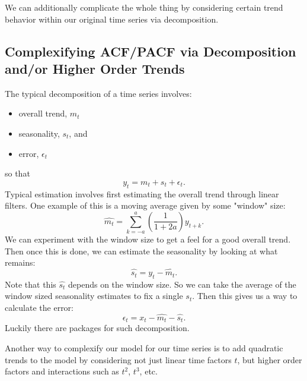 \documentclass[12pt]{article}
\theoremstyle{definition}
\begin{document}
We can additionally complicate the whole thing by considering certain trend behavior within our original time series via decomposition.

\subsection{Complexifying ACF/PACF via Decomposition and/or Higher Order Trends}
The typical decomposition of a time series involves:
\begin{itemize}
    \item overall trend, $m_t$
    \item seasonality, $s_t$, and
    \item error, $\epsilon_t$
\end{itemize}
so that
\[ y_t = m_t + s_t + \epsilon_t. \]
Typical estimation involves first estimating the overall trend through linear filters.  One example of this is a moving average given by some "window" size:
\[ \hat{m_t} = \sum_{k=-a}^a \left( \frac{1}{1+2a} \right) y_{t+k}. \]
We can experiment with the window size to get a feel for a good overall trend.  Then once this is done, we can estimate the seasonality by looking at what remains:
\[ \hat{s_t} = y_t - \hat{m_t}. \]
Note that this $\hat{s_t}$ depends on the window size.  So we can take the average of the window sized seasonality estimates to fix a single $s_t$.  Then this gives us a way to calculate the error:
\[ \epsilon_t = x_t - \hat{m_t} - \hat{s_t}. \]
Luckily there are packages for such decomposition.

Another way to complexify our model for our time series is to add quadratic trends to the model by considering not just linear time factors $t$, but higher order factors and interactions such as $t^2$, $t^3$, etc.
\end{document}

